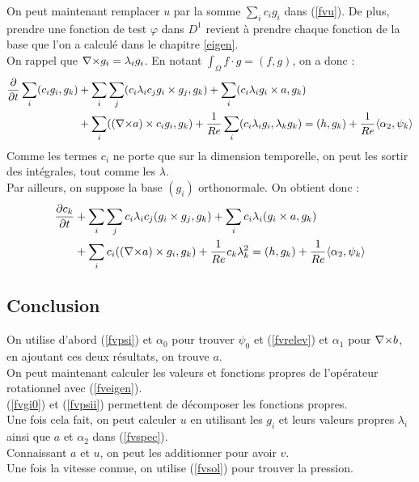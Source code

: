 On peut maintenant remplacer $u$ par la somme $\sum_ic_ig_i$ dans (\ref{fvu}). De plus, prendre une fonction de test $\varphi$ dans $D^1$ revient à prendre chaque fonction de la base que l'on a calculé dans le chapitre \ref{eigen}.\\
On rappel que ${\nabla\times} g_i=\lambda_ig_i$. En notant $\int_\Omega f\cdot g=(f,g)$, on a donc :
\begin{align*}
\frac{\partial}{\partial t}\sum_i (c_ig_i, g_k) &+ \sum_i\sum_j (c_i\lambda_ic_jg_i\times g_j,g_k) + \sum_i(c_i\lambda_ig_i\times a,g_k)\\
&+ \sum_i (({\nabla\times} a)\times c_ig_i,g_k) + \frac{1}{Re}\sum_i(c_i\lambda_ig_i, \lambda_kg_k) = (h,g_k) + \frac{1}{Re}\langle\alpha_2,\psi_k\rangle
\end{align*}
Comme les termes $c_i$ ne porte que sur la dimension temporelle, on peut les sortir des intégrales, tout comme les $\lambda$.\\
Par ailleurs, on suppose la base $(g_i)$ orthonormale. On obtient donc :
\begin{eqnarray}
\label{fvspec}
\begin{aligned}
\frac{\partial c_k}{\partial t} &+ \sum_i\sum_j c_i\lambda_i c_j(g_i\times g_j, g_k) + \sum_i c_i\lambda_i(g_i\times a,g_k)\\
&+ \sum_i c_i(({\nabla\times} a)\times g_i, g_k) + \frac{1}{Re}c_k\lambda_k^2 = (h,g_k) + \frac{1}{Re}\langle\alpha_2,\psi_k\rangle
\end{aligned}
\end{eqnarray}
 
\subsection{Conclusion}

On utilise d'abord (\ref{fvpsi}) et $\alpha_0$ pour trouver $\psi_0$ et (\ref{fvrelev}) et $\alpha_1$ pour ${\nabla\times} b$, en ajoutant ces deux résultats, on trouve $a$.\\
On peut maintenant calculer les valeurs et fonctions propres de l'opérateur rotationnel avec (\ref{fveigen}).\\
(\ref{fvgi0}) et (\ref{fvpsii}) permettent de décomposer les fonctions propres.\\
Une fois cela fait, on peut calculer $u$ en utilisant les $g_i$ et leurs valeurs propres $\lambda_i$ ainsi que $a$ et $\alpha_2$ dans (\ref{fvspec}).\\
Connaissant $a$ et $u$, on peut les additionner pour avoir $v$.\\
Une fois la vitesse connue, on utilise (\ref{fvsol}) pour trouver la pression. 
